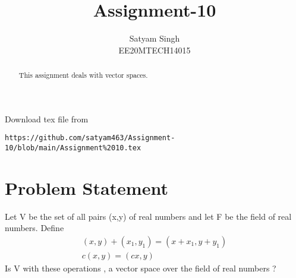 \documentclass[journal,12pt,twocolumn]{IEEEtran}
\begin{document}
\renewcommand{\thefigure}{\theproblem}
\def\putbox#1#2#3{\makebox[0in][l]{\makebox[#1][l]{}\raisebox{\baselineskip}[0in][0in]{\raisebox{#2}[0in][0in]{#3}}}}
     \def\rightbox#1{\makebox[0in][r]{#1}}
     \def\centbox#1{\makebox[0in]{#1}}
     \def\topbox#1{\raisebox{-\baselineskip}[0in][0in]{#1}}
     \def\midbox#1{\raisebox{-0.5\baselineskip}[0in][0in]{#1}}
\vspace{3cm}
\title{Assignment-10}
\author{Satyam Singh \\ EE20MTECH14015}
\maketitle
\newpage
\bigskip
\renewcommand{\thefigure}{\theenumi}
\renewcommand{\thetable}{\theenumi}
\begin{abstract}
This assignment deals with vector spaces.
\end{abstract}
Download  tex file from 
\begin{lstlisting}
https://github.com/satyam463/Assignment-10/blob/main/Assignment%2010.tex
\end{lstlisting}
\section{Problem Statement}
Let V be the set of all pairs (x,y) of real numbers and let F be the field of real numbers. Define 
\begin{align}
(x,y)+(x_1,y_1)=(x+x_1,y+y_1)\\
c(x,y)=(cx,y)
\end{align}
Is V with these operations , a vector space over the field of real numbers ?
\end{document}
